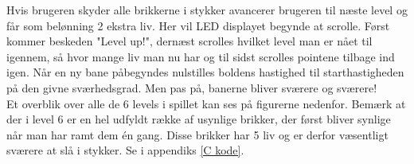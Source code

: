 Hvis brugeren skyder alle brikkerne i stykker avancerer brugeren til næste level og får som belønning 2 ekstra liv. Her vil LED displayet begynde at scrolle. Først kommer beskeden "Level up!", dernæst scrolles hvilket level man er nået til igennem, så hvor mange liv man nu har og til sidst scrolles pointene tilbage ind igen. Når en ny bane påbegyndes nulstilles boldens hastighed til starthastigheden på den givne sværhedsgrad. Men pas på, banerne bliver sværere og sværere!\\

Et overblik over alle de 6 levels i spillet kan ses på figurerne nedenfor. Bemærk at der i level 6 er en hel udfyldt række af usynlige brikker, der først bliver synlige når man har ramt dem én gang. Disse brikker har 5 liv og er derfor væsentligt sværere at slå i stykker. Se  i appendiks \ref{C kode}. \\

